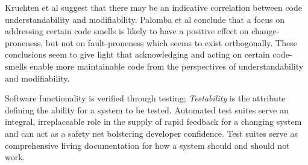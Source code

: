 Kruchten et al \parencite*{kruchten2012technical} suggest that there may be an indicative correlation between code understandability and modifiability. Palomba et al \parencite*{palomba2018diffuseness} conclude that a focus on addressing certain code smells \parencite[chapter~3]{fowler1999refactoring} is likely to have a positive effect on change-proneness, but not on fault-proneness which seems to exist orthogonally. These conclusions seem to give light that acknowledging and acting on certain code-smells enable more maintainable code from the perspectives of understandability and modifiability. 

Software functionality is verified through testing; \textit{Testability} is the attribute defining the ability for a system to be tested.  Automated test suites serve an integral, irreplaceable role in the supply of rapid feedback for a changing system and can act as a safety net bolstering developer confidence.  Test suites serve as comprehensive living documentation for how a system should and should not work. 